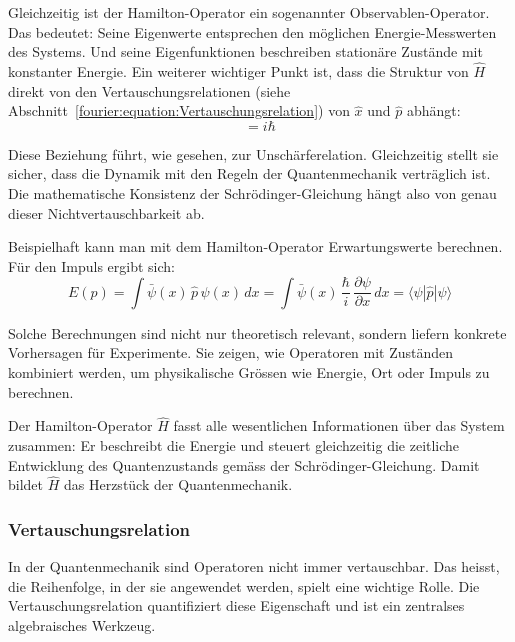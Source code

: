 		Gleichzeitig ist der Hamilton-Operator ein sogenannter Observablen-Operator.
		Das bedeutet:
		Seine Eigenwerte entsprechen den möglichen Energie-Messwerten des Systems.
		Und seine Eigenfunktionen beschreiben stationäre Zustände mit konstanter Energie.
		Ein weiterer wichtiger Punkt ist, dass die Struktur von \( \hat{H} \) direkt von den Vertauschungsrelationen (siehe Abschnitt~\ref{fourier:equation:Vertauschungsrelation}) von \( \hat{x} \) und \( \hat{p} \) abhängt:
		\begin{equation}
			[\hat{x}, \hat{p}] = i \hbar
		\end{equation}

		Diese Beziehung führt, wie gesehen, zur Unschärferelation.
		Gleichzeitig stellt sie sicher, dass die Dynamik mit den Regeln der Quantenmechanik verträglich ist.
		Die mathematische Konsistenz der Schrödinger-Gleichung hängt also von genau dieser Nichtvertauschbarkeit ab.

		Beispielhaft kann man mit dem Hamilton-Operator Erwartungswerte berechnen.
		Für den Impuls ergibt sich:
		\begin{equation}
			E(p) = \int \bar{\psi}(x) \, \hat{p} \, \psi(x) \, dx 
			= \int \bar{\psi}(x) \, \frac{\hbar}{i} \, \frac{\partial \psi}{\partial x} \, dx 
			= \langle \psi | \hat{p} | \psi \rangle
		\end{equation}


		Solche Berechnungen sind nicht nur theoretisch relevant, sondern liefern konkrete Vorhersagen für Experimente.
		Sie zeigen, wie Operatoren mit Zuständen kombiniert werden, um physikalische Grössen wie Energie, Ort oder Impuls zu berechnen.

		Der Hamilton-Operator $\hat{H}$ fasst alle wesentlichen Informationen über das System zusammen:
		Er beschreibt die Energie und steuert gleichzeitig die zeitliche Entwicklung des Quantenzustands gemäss der Schrödinger-Gleichung.
		Damit bildet $\hat{H}$ das Herzstück der Quantenmechanik.

	\subsubsection{Vertauschungsrelation\label{fourier:subsubsection:Vertauschungsrelation}}
		In der Quantenmechanik sind Operatoren nicht immer vertauschbar.
		Das heisst, die Reihenfolge, in der sie angewendet werden, spielt eine wichtige Rolle.
		Die Vertauschungsrelation quantifiziert diese Eigenschaft und ist ein zentralses algebraisches Werkzeug.

